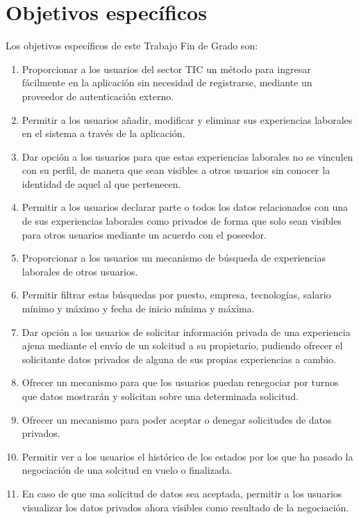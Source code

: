 \documentclass[a4paper, 12pt]{book}
\begin{document}
\section{Objetivos específicos}
\label{sec:target_specifictargets}

Los objetivos específicos de este Trabajo Fin de Grado son:

\begin{enumerate}
  \item Proporcionar a los usuarios del sector TIC un método para ingresar fácilmente en la aplicación sin necesidad de registrarse, mediante un proveedor de autenticación externo.
  \item Permitir a los usuarios añadir, modificar y eliminar sus experiencias laborales en el sistema a través de la aplicación.
  \item Dar opción a los usuarios para que estas experiencias laborales no se vinculen con su perfil, de manera que sean visibles a otros usuarios sin conocer la identidad de aquel al que pertenecen.
  \item Permitir a los usuarios declarar parte o todos los datos relacionados con una de sus experiencias laborales como privados de forma que solo sean visibles para otros usuarios mediante un acuerdo con el poseedor.
  \item Proporcionar a los usuarios un mecanismo de búsqueda de experiencias laborales de otros usuarios.
  \item Permitir filtrar estas búsquedas por puesto, empresa, tecnologías, salario mínimo y máximo y fecha de inicio mínima y máxima.
  \item Dar opción a los usuarios de solicitar información privada de una experiencia ajena mediante el envío de un solcitud a su propietario, pudiendo ofrecer el solicitante datos privados de alguna de sus propias experiencias a cambio.
  \item Ofrecer un mecanismo para que los usuarios puedan renegociar por turnos que datos mostrarán y solicitan sobre una determinada solicitud.
  \item Ofrecer un mecanismo para poder aceptar o denegar solicitudes de datos privados.
  \item Permitir ver a los usuarios el histórico de los estados por los que ha pasado la negociación de una solcitud en vuelo o finalizada.
  \item En caso de que una solicitud de datos sea aceptada, permitir a los usuarios visualizar los datos privados ahora visibles como resultado de la negociación.
\end{enumerate}
\end{document}
